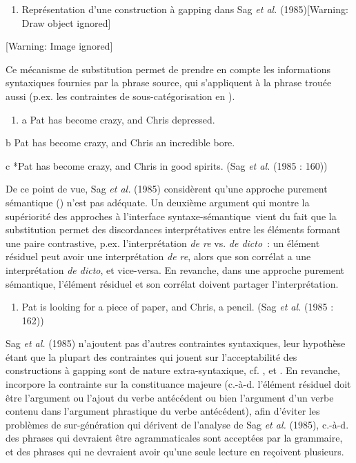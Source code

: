 \begin{enumerate}
\item   Représentation d'une construction à gapping dans Sag \textit{et al.} (1985)[Warning: Draw object ignored]  


\end{enumerate}
{   [Warning: Image ignored] %
} 

Ce mécanisme de substitution permet de prendre en compte les informations syntaxiques fournies par la phrase source, qui s'appliquent à la phrase trouée aussi (p.ex. les contraintes de sous-catégorisation en ). 


\begin{enumerate}
\item \label{bkm:Ref289880599}a   Pat has become crazy, and Chris depressed.  


\end{enumerate}
  b  Pat has become crazy, and Chris an incredible bore.

c  *Pat has become crazy, and Chris in good spirits.     (Sag \textit{et al.} (1985 : 160))

De ce point de vue, Sag \textit{et al.} (1985) considèrent qu'une approche purement sémantique (\citet{Stump1978}) n'est pas adéquate. Un deuxième argument qui montre la supériorité des approches à l'interface syntaxe-sémantique~vient du fait que la substitution permet des discordances interprétatives entre les éléments formant une paire contrastive, p.ex. l'interprétation \textit{de re} vs. \textit{de dicto~}: un élément résiduel peut avoir une interprétation \textit{de re}, alors que son corrélat a une interprétation \textit{de dicto}, et vice-versa. En revanche, dans une approche purement sémantique, l'élément résiduel et son corrélat doivent partager l'interprétation.


\begin{enumerate}
\item Pat is looking for a piece of paper, and Chris, a pencil.      (Sag \textit{et al.} (1985 : 162))


\end{enumerate}
Sag \textit{et al.} (1985) n'ajoutent pas d'autres contraintes syntaxiques, leur hypothèse étant que la plupart des contraintes qui jouent sur l'acceptabilité des constructions à gapping sont de nature extra-syntaxique, cf. \citet{Hankamer1973}, \citet{Kuno1976} et \citet{Sag1976}. En revanche, \citet{Gardent1991} incorpore la contrainte sur la constituance majeure (c.-à-d. l'élément résiduel doit être l'argument ou l'ajout du verbe antécédent ou bien l'argument d'un verbe contenu dans l'argument phrastique du verbe antécédent), afin d'éviter les problèmes de sur-génération qui dérivent de l'analyse de Sag \textit{et al.} (1985), c.-à-d. des phrases qui devraient être agrammaticales sont acceptées par la grammaire, et des phrases qui ne devraient avoir qu'une seule lecture en reçoivent plusieurs.  

